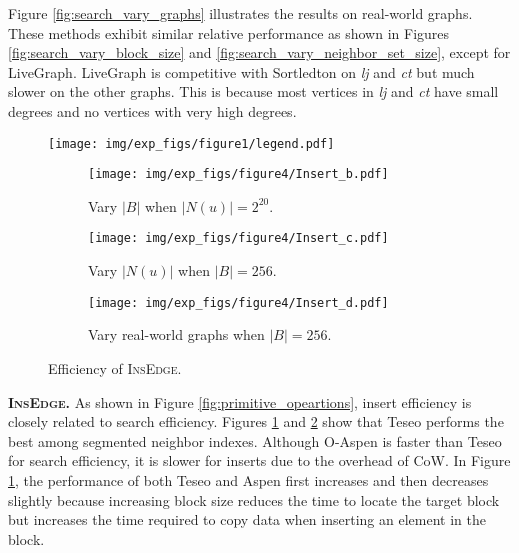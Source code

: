 Figure \ref{fig:search_vary_graphs} illustrates the results on real-world graphs. These methods exhibit similar relative performance as shown in Figures \ref{fig:search_vary_block_size} and \ref{fig:search_vary_neighbor_set_size}, except for LiveGraph. LiveGraph is competitive with Sortledton on \emph{lj} and \emph{ct} but much slower on the other graphs. This is because most vertices in \emph{lj} and \emph{ct} have small degrees and no vertices with very high degrees.



\begin{figure}[h!]
	\setlength{\abovecaptionskip}{0pt}
	\setlength{\belowcaptionskip}{0pt}
		\captionsetup[subfigure]{aboveskip=0pt,belowskip=0pt}
	\centering
    \texttt{[image: img/exp\_figs/figure1/legend.pdf]}\\
	\begin{subfigure}[t]{0.30\textwidth}
		\centering
		\texttt{[image: img/exp\_figs/figure4/Insert\_b.pdf]}
		\caption{Vary $|B|$ when $|N(u)| = 2 ^ {20}$.}
		\label{fig:insert_vary_block_size}
	\end{subfigure}
        \begin{subfigure}[t]{0.30\textwidth}
		\centering
		\texttt{[image: img/exp\_figs/figure4/Insert\_c.pdf]}
		\caption{Vary $|N(u)|$ when $|B| = 256$.}
		\label{fig:insert_vary_neighbor_set_size}
	\end{subfigure}
        \begin{subfigure}[t]{0.60\textwidth}
		\centering
		\texttt{[image: img/exp\_figs/figure4/Insert\_d.pdf]}
		\caption{Vary real-world graphs when $|B| = 256$.}
		\label{fig:insert_vary_graphs}
        
	\end{subfigure}
    
	\caption{Efficiency of \textsc{InsEdge}.}
	\label{fig:insert}
\end{figure}


\vspace{2pt}
\noindent\textbf{\textsc{InsEdge}.} As shown in Figure \ref{fig:primitive_opeartions}, insert efficiency is closely related to search efficiency. Figures \ref{fig:insert_vary_block_size} and \ref{fig:insert_vary_neighbor_set_size} show that Teseo performs the best among segmented neighbor indexes. Although O-Aspen is faster than Teseo for search efficiency, it is slower for inserts due to the overhead of CoW. In Figure \ref{fig:insert_vary_block_size}, the performance of both Teseo and Aspen first increases and then decreases slightly because increasing block size reduces the time to locate the target block but increases the time required to copy data when inserting an element in the block.


